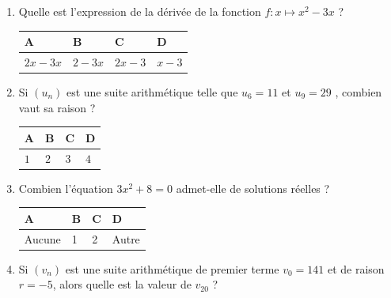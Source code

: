 \documentclass[oneside,12pt]{exam}          %
\begin{document}
\begin{enumerate}[label=\underline{Question \no\arabic*} :  , leftmargin=* , itemsep=4mm]
	\item Quelle est l'expression de la dérivée de la fonction $f : x \mapsto x^2 - 3x$ \; ?
	
		\hspace{\linewidth-\textwidth}
		\renewcommand{\arraystretch}{1.5}
		\begin{tabular}{| P{0.22\textwidth} | P{0.22\textwidth} | P{0.22\textwidth} | P{0.22\textwidth} |} \hline
			A & B & C & D \\ \hline
			$2x - 3x$ & $2 - 3x$ & $2x - 3$ & $x -3$ \\ \hline
		\end{tabular}



	\item Si $(u_n)$ est une suite arithmétique telle que $u_6 = 11$ et $u_9 = 29$ , combien vaut sa raison ?
	
		\hspace{\linewidth-\textwidth}
		\renewcommand{\arraystretch}{1.5}
		\begin{tabular}{| P{0.22\textwidth} | P{0.22\textwidth} | P{0.22\textwidth} | P{0.22\textwidth} |} \hline
			A & B & C & D \\ \hline
			$1$ & $2$ & $3$ & $4$ \\ \hline
		\end{tabular}
		
		

	\item Combien l'équation $3x^2 + 8 = 0$ admet-elle de solutions réelles ?
	
		\hspace{\linewidth-\textwidth}
		\renewcommand{\arraystretch}{1.5}
		\begin{tabular}{| P{0.22\textwidth} | P{0.22\textwidth} | P{0.22\textwidth} | P{0.22\textwidth} |} \hline
			A & B & C & D \\ \hline
			Aucune & 1 & 2 & Autre \\ \hline
		\end{tabular}
		
		

	\item Si $(v_n)$ est une suite arithmétique de premier terme $v_0 = 141$ et de raison $r = -5$, alors quelle est la valeur de $v_{20}$ ?
	

\end{enumerate}
\end{document}
